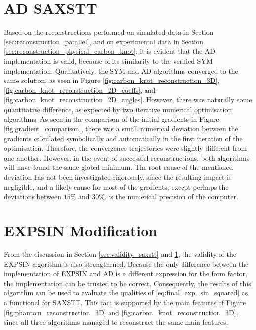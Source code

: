 


\section{AD SAXSTT}\label{sec:ad_validation}
Based on the reconstructions performed on simulated data in Section \ref{sec:reconstruction_parallel},
and on experimental data in Section \ref{sec:reconstruction_physical_carbon_knot},
it is evident that the AD implementation is valid, because of its similarity to the verified SYM implementation.
Qualitatively, the SYM and AD algorithms converged to the same solution, as seen in Figure \ref{fig:carbon_knot_reconstruction_3D}, \ref{fig:carbon_knot_reconstruction_2D_coeffs}, and \ref{fig:carbon_knot_reconstruction_2D_angles}.
However, there was naturally some quantitative difference, as expected by two iterative numerical optimisation algorithms.
As seen in the comparison of the initial gradients in Figure \ref{fig:gradient_comparison},
there was a small numerical deviation between the gradients calculated symbolically and automatically in the first iteration of the optimisation.
Therefore, the convergence trajectories were slightly different from one another. However, in the event of successful reconstructions,
both algorithms will have found the same global minimum.
The root cause of the mentioned deviation has not been investigated rigorously, since the resulting impact is negligible,
and a likely cause for most of the gradients, except perhaps the deviations between $15\%$ and $30\%$, is the numerical precision of the computer.


\section{EXPSIN Modification}\label{sec:saxstt_validation}
From the discussion in Section \ref{sec:validity_saxstt} and \ref{sec:ad_validation}, the validity of the EXPSIN algorithm is also strengthened.
Because the only difference between the implementation of EXPSIN and AD is a different expression for the form factor, the implementation can be trusted to be correct.
Consequently, the results of this algorithm can be used to evaluate the qualities of \eqref{eq:final_exp_sin_squared} as a functional for SAXSTT.
This fact is supported by the main features of Figure \ref{fig:phantom_reconstruction_3D} and \ref{fig:carbon_knot_reconstruction_3D},
since all three algorithms managed to reconstruct the same main features.


